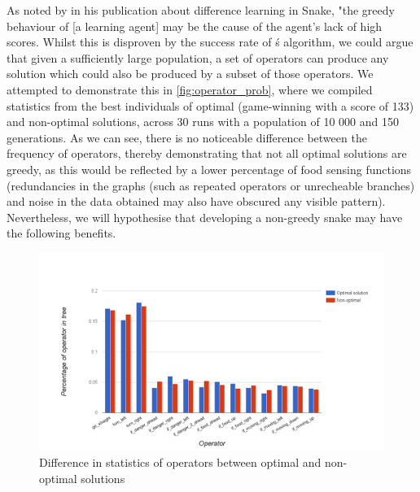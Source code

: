 \documentclass[british,10pt,a4paper]{article}
\begin{document}
As noted by \citet{Christopher_Lockhart2010-em} in his publication about difference learning in Snake, "the greedy behaviour of [a learning agent] may be the cause of the agent's lack of high scores. Whilst this is disproven by the success rate of \citeauthor{Ehlis2000-sz}\'s algorithm, we could argue that given a sufficiently large population, a set of operators can produce any solution which could also be produced by a subset of those operators. We attempted to demonstrate this in \autoref{fig:operator_prob}, where we compiled statistics from the best individuals of optimal (game-winning with a score of 133) and non-optimal solutions, across 30 runs with a population of 10 000 and 150 generations. As we can see, there is no noticeable difference between the frequency of operators, thereby demonstrating that not all optimal solutions are greedy, as this would be reflected by a lower percentage of food sensing functions (redundancies in the graphs (such as repeated operators or unrecheable branches) and noise in the data obtained may also have obscured any visible pattern). Nevertheless, we will hypothesise that developing a non-greedy snake may have the following benefits.

\begin{figure}
\centering
	\includegraphics[width=\textwidth,keepaspectratio]{images/operator_prob.png}
	\caption{Difference in statistics of operators between optimal and non-optimal solutions}
	\label{fig:operator_prob}
\end{figure}
\end{document}
